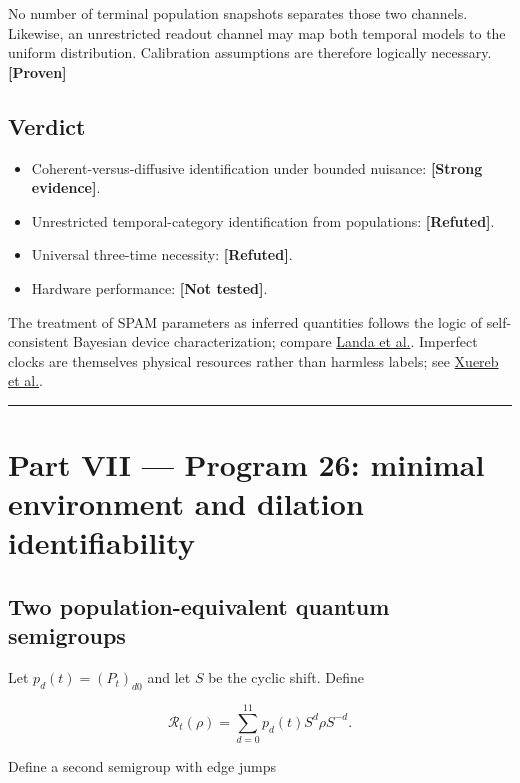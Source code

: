 \documentclass[11pt,a4paper,openany]{report}
\newcommand{\statusProven}{\textcolor{fingreen}{[Proven]}}
\newcommand{\statusStrong}{\textcolor{finblue}{[Strong evidence]}}
\newcommand{\statusRefuted}{\textcolor{finred}{[Refuted]}}
\begin{document}
No number of terminal population snapshots separates those two channels. Likewise, an unrestricted readout channel may map both temporal models to the uniform distribution. Calibration assumptions are therefore logically necessary. \textbf{\statusProven{}}

\section{Verdict}

\begin{itemize}
\item 
Coherent-versus-diffusive identification under bounded nuisance: \textbf{\statusStrong{}}.

\item 
Unrestricted temporal-category identification from populations: \textbf{\statusRefuted{}}.

\item 
Universal three-time necessity: \textbf{\statusRefuted{}}.

\item 
Hardware performance: \textbf{[Not tested]}.

\end{itemize}

The treatment of SPAM parameters as inferred quantities follows the logic of self-consistent Bayesian device characterization; compare \href{https://doi.org/10.1103/PhysRevResearch.4.013199}{Landa et al.}. Imperfect clocks are themselves physical resources rather than harmless labels; see \href{https://doi.org/10.1103/PhysRevLett.131.160204}{Xuereb et al.}.

\par\medskip\hrule\medskip

\chapter{Part VII — Program 26: minimal environment and dilation identifiability}

\section{Two population-equivalent quantum semigroups}

Let \(p_d(t)=(P_t)_{d0}\) and let \(S\) be the cyclic shift. Define

\[
\mathcal R_t(\rho)
=\sum_{d=0}^{11}p_d(t)S^d\rho S^{-d}.
\]

Define a second semigroup with edge jumps
\end{document}
